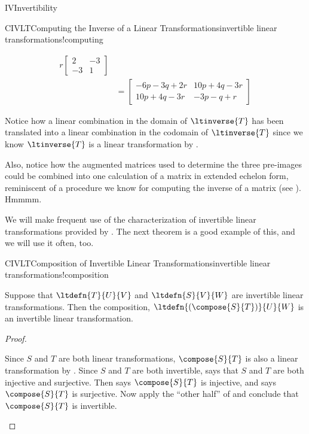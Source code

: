 \begin{subsect}{IV}{Invertibility}
\begin{example}{CIVLT}{Computing the Inverse of a Linear Transformations}{invertible linear transformations!computing}
\begin{para}
\begin{align*}
r\begin{bmatrix}2&-3\\-3&1\end{bmatrix}\\
&=
\begin{bmatrix}
-6p-3q+2r & 10p+4q-3r \\
10p+4q-3r & -3p -q + r
\end{bmatrix}
\end{align*}
\end{para}
%
\begin{para}Notice how a linear combination in the domain of $\ltinverse{T}$ has been translated into a linear combination in the codomain of $\ltinverse{T}$ since we know $\ltinverse{T}$ is a linear transformation by .\end{para}
%
\begin{para}Also, notice how the augmented matrices used to determine the three pre-images could be combined into one calculation of a matrix in extended echelon form, reminiscent of a procedure we know for computing the inverse of a matrix (see ).  Hmmmm.\end{para}
%
\end{example}
%
\begin{para}We will make frequent use of the characterization of invertible linear transformations provided by .  The next theorem is a good example of this, and we will use it often, too.\end{para}
%
\begin{theorem}{CIVLT}{Composition of Invertible Linear Transformations}{invertible linear transformations!composition}
\begin{para}Suppose that $\ltdefn{T}{U}{V}$ and $\ltdefn{S}{V}{W}$ are invertible linear transformations.  Then the composition, $\ltdefn{\left(\compose{S}{T}\right)}{U}{W}$ is an invertible linear transformation.\end{para}
\end{theorem}
%
\begin{proof}
\begin{para}Since $S$ and $T$ are both linear transformations,  $\compose{S}{T}$ is also a linear transformation by .    Since $S$ and $T$ are both invertible,  says that $S$ and $T$ are both injective and surjective.  Then  says $\compose{S}{T}$ is injective, and  says $\compose{S}{T}$ is surjective.  Now apply the ``other half'' of  and conclude that $\compose{S}{T}$ is invertible.\end{para}

\end{proof}
\end{subsect}

